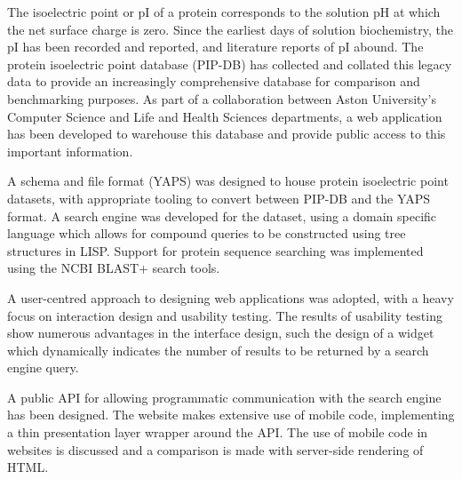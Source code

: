 \thispagestyle{plain}


\begin{center}
  \Large
  \textbf{\@title}

  \vspace{0.4cm}
  \large
  \subtitle{}

  \vspace{0.4cm}
  \@author
\end{center}



The isoelectric point or pI of a protein corresponds to the solution
pH at which the net surface charge is zero. Since the earliest days of
solution biochemistry, the pI has been recorded and
reported, and literature reports of pI abound. The protein isoelectric
point database (PIP-DB) has collected and collated this legacy data to
provide an increasingly comprehensive database for comparison and
benchmarking purposes. As part of a collaboration between Aston
University's Computer Science and Life and Health Sciences
departments, a web application has been developed to warehouse this
database and provide public access to this important information.

A schema and file format (YAPS) was designed to house protein
isoelectric point datasets, with appropriate tooling to convert
between PIP-DB and the YAPS format. A search engine was developed for
the dataset, using a domain specific language which allows for
compound queries to be constructed using tree structures in
LISP. Support for protein sequence searching was implemented using the
NCBI BLAST+ search tools.

A user-centred approach to designing web applications was adopted,
with a heavy focus on interaction design and usability testing. The
results of usability testing show numerous advantages in the interface
design, such the design of a widget which dynamically indicates the
number of results to be returned by a search engine query.

A public API for allowing programmatic communication with the search
engine has been designed. The website makes extensive use of mobile
code, implementing a thin presentation layer wrapper around the
API. The use of mobile code in websites is discussed and a comparison
is made with server-side rendering of HTML.

